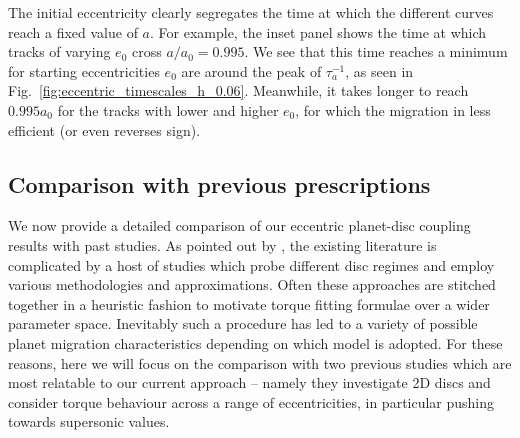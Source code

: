 The initial eccentricity clearly segregates the time at which the different curves reach a fixed value of $a$. For example, the inset panel shows the time at which tracks of varying $e_0$ cross $a/a_0 = 0.995$. We see that this time reaches a minimum for starting eccentricities $e_0$ are around the peak of $\tau_a^{-1}$, as seen in Fig.~\ref{fig:eccentric_timescales_h_0.06}. Meanwhile, it takes longer to reach $0.995a_0$ for the tracks with lower and higher $e_0$, for which the migration in less efficient (or even reverses sign).

\subsection{Comparison with previous prescriptions}
\label{subsection:previous_results}

We now provide a detailed comparison of our eccentric planet-disc coupling results with past studies. As pointed out by \cite{IdaEtAl_2020}, the existing literature is complicated by a host of studies which probe different disc regimes and employ various methodologies and approximations. Often these approaches are stitched together in a heuristic fashion to motivate torque fitting formulae over a wider parameter space. Inevitably such a procedure has led to a variety of possible planet migration characteristics depending on which model is adopted. For these reasons, here we will focus on the comparison with two previous studies which are most relatable to our current approach -- namely they investigate 2D discs and consider torque behaviour across a range of eccentricities, in particular pushing towards supersonic values. 

